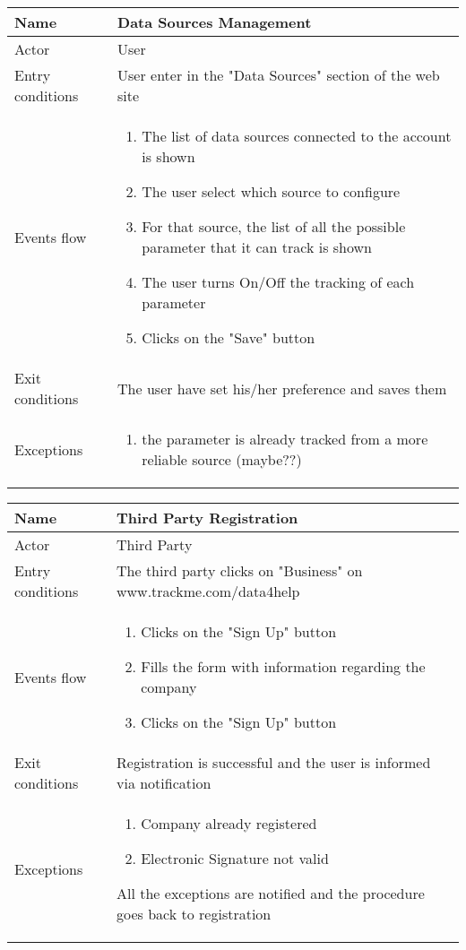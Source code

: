 \begin{table}[h!]
\begin{tabular}{|l|p{12cm}|}
\hline
Name             & Data Sources Management \\ \hline
Actor            & User \\ \hline
Entry conditions & User enter in the "Data Sources" section of the web site \\ \hline
Events flow      & \begin{enumerate}
\item The list of data sources connected to the account is shown
\item The user select which source to configure
\item For that source, the list of all the possible parameter that it can track is shown
\item The user turns On/Off the tracking of each parameter
\item Clicks on the "Save" button
\end{enumerate} \\ \hline

Exit conditions  & The user have set his/her preference and saves them \\ \hline
Exceptions       & \begin{enumerate}
\item the parameter is already tracked from a more reliable source (maybe??)
\end{enumerate} \\ \hline
\end{tabular}
\end{table}

\begin{table}[h!]
\begin{tabular}{|l|p{12cm}|}
\hline
Name             & Third Party Registration \\ \hline
Actor            & Third Party \\ \hline
Entry conditions & The third party clicks on "Business" on www.trackme.com/data4help \\ \hline
Events flow      & \begin{enumerate}
\item Clicks on the "Sign Up" button
\item Fills the form with information regarding the company
\item Clicks on the "Sign Up" button
\end{enumerate} \\ \hline
Exit conditions  & Registration is successful and the user is informed via notification \\ \hline
Exceptions       & \begin{enumerate}
\item Company already registered
\item Electronic Signature not valid
\end{enumerate} All the exceptions are notified and the procedure goes back to registration \\ \hline
\end{tabular}
\end{table}

